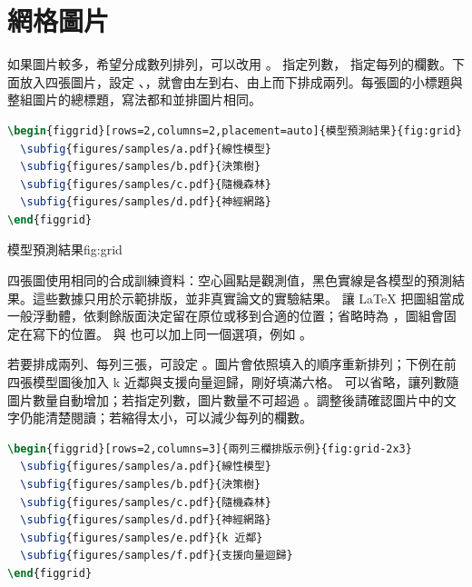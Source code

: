\section{網格圖片}

如果圖片較多，希望分成數列排列，可以改用 。 指定列數， 指定每列的欄數。下面放入四張圖片，設定 、，就會由左到右、由上而下排成兩列。每張圖的小標題與整組圖片的總標題，寫法都和並排圖片相同。

\begin{lstlisting}[language=latex]
\begin{figgrid}[rows=2,columns=2,placement=auto]{模型預測結果}{fig:grid}
  \subfig{figures/samples/a.pdf}{線性模型}
  \subfig{figures/samples/b.pdf}{決策樹}
  \subfig{figures/samples/c.pdf}{隨機森林}
  \subfig{figures/samples/d.pdf}{神經網路}
\end{figgrid}
\end{lstlisting}

\begin{figgrid}[rows=2,columns=2,placement=auto]{模型預測結果}{fig:grid}
\end{figgrid}

四張圖使用相同的合成訓練資料：空心圓點是觀測值，黑色實線是各模型的預測結果。這些數據只用於示範排版，並非真實論文的實驗結果。 讓 \LaTeX{} 把圖組當成一般浮動體，依剩餘版面決定留在原位或移到合適的位置；省略時為 ，圖組會固定在寫下的位置。 與 \code{\fig} 也可以加上同一個選項，例如 。

若要排成兩列、每列三張，可設定 。圖片會依照填入的順序重新排列；下例在前四張模型圖後加入 k 近鄰與支援向量迴歸，剛好填滿六格。 可以省略，讓列數隨圖片數量自動增加；若指定列數，圖片數量不可超過 。調整後請確認圖片中的文字仍能清楚閱讀；若縮得太小，可以減少每列的欄數。

\begin{lstlisting}[language=latex]
\begin{figgrid}[rows=2,columns=3]{兩列三欄排版示例}{fig:grid-2x3}
  \subfig{figures/samples/a.pdf}{線性模型}
  \subfig{figures/samples/b.pdf}{決策樹}
  \subfig{figures/samples/c.pdf}{隨機森林}
  \subfig{figures/samples/d.pdf}{神經網路}
  \subfig{figures/samples/e.pdf}{k 近鄰}
  \subfig{figures/samples/f.pdf}{支援向量迴歸}
\end{figgrid}
\end{lstlisting}

